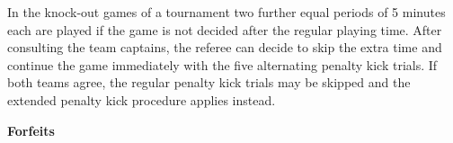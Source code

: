 \bigskip

In the knock-out games of a tournament two further equal periods of 5 minutes each are played if the game is not decided after the regular playing time.  After consulting the team captains, the referee can decide to skip the extra time and continue the game immediately with the five alternating penalty kick trials. If both teams agree, the regular penalty kick trials may be skipped and the extended penalty kick procedure applies instead.

\bigskip




\bigskip


\bigskip

{\bfseries Forfeits}

\headlinebox

